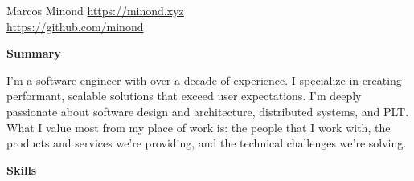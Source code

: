 \documentclass[10pt]{article}
\newcommand{\SectionTitle}[2][.2in] {
  \vspace{#1}
  \textbf{\large #2}
  \vspace{.1in}
}
\begin{document}
\begin{flushleft}

\huge{Marcos Minond} \normalsize
\hfill \href{https://minond.xyz}{https://minond.xyz} \\
\hfill \href{https://github.com/minond}{https://github.com/minond}

\normalsize


\SectionTitle[.025in]{Summary}

I'm a software engineer with over a decade of experience. I specialize in creating performant, scalable solutions that exceed user expectations. I'm deeply passionate about software design and architecture, distributed systems, and PLT. What I value most from my place of work is: the people that I work with, the products and services we're providing, and the technical challenges we're solving.




%

\SectionTitle{Skills}



\end{flushleft}
\end{document}
